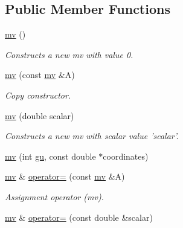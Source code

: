 \subsection*{Public Member Functions}
\begin{DoxyCompactItemize}
\item 
\hypertarget{classe3ga_1_1mv_a2fed95e1a51c1496629870aceaceebf8}{\hyperlink{classe3ga_1_1mv_a2fed95e1a51c1496629870aceaceebf8}{mv} ()}\label{classe3ga_1_1mv_a2fed95e1a51c1496629870aceaceebf8}

\begin{DoxyCompactList}\small\item\em Constructs a new mv with value 0. \end{DoxyCompactList}\item 
\hypertarget{classe3ga_1_1mv_a0d8e852ce8683e08c823995a178d2987}{\hyperlink{classe3ga_1_1mv_a0d8e852ce8683e08c823995a178d2987}{mv} (const \hyperlink{classe3ga_1_1mv}{mv} \&A)}\label{classe3ga_1_1mv_a0d8e852ce8683e08c823995a178d2987}

\begin{DoxyCompactList}\small\item\em Copy constructor. \end{DoxyCompactList}\item 
\hypertarget{classe3ga_1_1mv_acb9d4d8ea528337f66d9dc39949ac125}{\hyperlink{classe3ga_1_1mv_acb9d4d8ea528337f66d9dc39949ac125}{mv} (double scalar)}\label{classe3ga_1_1mv_acb9d4d8ea528337f66d9dc39949ac125}

\begin{DoxyCompactList}\small\item\em Constructs a new mv with scalar value 'scalar'. \end{DoxyCompactList}\item 
\hyperlink{classe3ga_1_1mv_a042aea0a6e2b4e2ee7bef93ac042b50c}{mv} (int \hyperlink{classe3ga_1_1mv_a66b360fa8609ea9243f1c92b33d8e102}{gu}, const double $\ast$coordinates)
\item 
\hypertarget{classe3ga_1_1mv_aa0b8cdd731cc90f90c032d867b62b8d4}{\hyperlink{classe3ga_1_1mv}{mv} \& \hyperlink{classe3ga_1_1mv_aa0b8cdd731cc90f90c032d867b62b8d4}{operator=} (const \hyperlink{classe3ga_1_1mv}{mv} \&A)}\label{classe3ga_1_1mv_aa0b8cdd731cc90f90c032d867b62b8d4}

\begin{DoxyCompactList}\small\item\em Assignment operator (mv). \end{DoxyCompactList}\item 
\hypertarget{classe3ga_1_1mv_a3979933811447bea7bbf8a2d73dec4f5}{\hyperlink{classe3ga_1_1mv}{mv} \& \hyperlink{classe3ga_1_1mv_a3979933811447bea7bbf8a2d73dec4f5}{operator=} (const double \&scalar)}\label{classe3ga_1_1mv_a3979933811447bea7bbf8a2d73dec4f5}


\end{DoxyCompactItemize}
